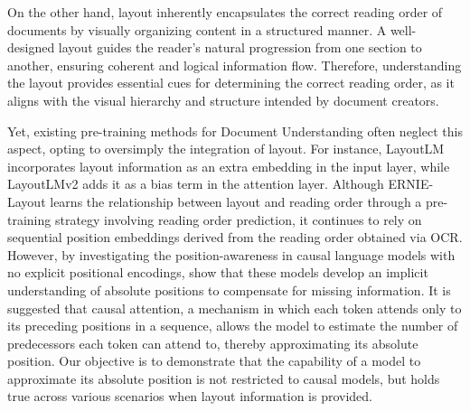 
On the other hand, layout inherently encapsulates the correct reading order of documents by visually organizing content in a structured manner. A well-designed layout guides the reader's natural progression from one section to another, ensuring coherent and logical information flow. Therefore, understanding the layout provides essential cues for determining the correct reading order, as it aligns with the visual hierarchy and structure intended by document creators. 

Yet, existing pre-training methods for Document Understanding often neglect this aspect, opting to oversimply the integration of layout. For instance, LayoutLM \citep{xu2020layoutlm} incorporates layout information as an extra embedding in the input layer, while LayoutLMv2 \citep{xu2020layoutlmv2} adds it as a bias term in the attention layer. Although ERNIE-Layout \citep{peng2022ernie} learns the relationship between layout and reading order through a pre-training strategy involving reading order prediction, it continues to rely on sequential position embeddings derived from the reading order obtained via \ac{OCR}. However, by investigating the position-awareness in causal language models with no explicit positional encodings, \citet{haviv2022transformer} show that these models develop an implicit understanding of absolute positions to compensate for missing information. It is suggested that causal attention, a mechanism in which each token attends only to its preceding positions in a sequence, allows the model to estimate the number of predecessors each token can attend to, thereby approximating its absolute position. Our objective is to demonstrate that the capability of a model to approximate its absolute position is not restricted to causal models, but holds true across various scenarios when layout information is provided.

